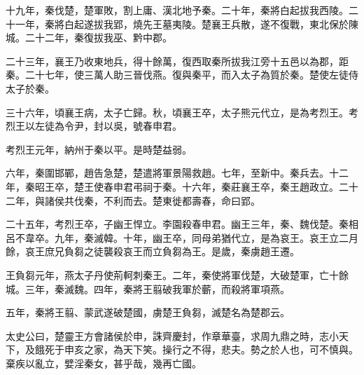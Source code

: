 十九年，秦伐楚，楚軍敗，割上庸、漢北地予秦。二十年，秦將白起拔我西陵。二十一年，秦將白起遂拔我郢，燒先王墓夷陵。楚襄王兵散，遂不復戰，東北保於陳城。二十二年，秦復拔我巫、黔中郡。

二十三年，襄王乃收東地兵，得十餘萬，復西取秦所拔我江旁十五邑以為郡，距秦。二十七年，使三萬人助三晉伐燕。復與秦平，而入太子為質於秦。楚使左徒侍太子於秦。

三十六年，頃襄王病，太子亡歸。秋，頃襄王卒，太子熊元代立，是為考烈王。考烈王以左徒為令尹，封以吳，號春申君。

考烈王元年，納州于秦以平。是時楚益弱。

六年，秦圍邯鄲，趙告急楚，楚遣將軍景陽救趙。七年，至新中。秦兵去。十二年，秦昭王卒，楚王使春申君弔祠于秦。十六年，秦莊襄王卒，秦王趙政立。二十二年，與諸侯共伐秦，不利而去。楚東徙都壽春，命曰郢。

二十五年，考烈王卒，子幽王悍立。李園殺春申君。幽王三年，秦、魏伐楚。秦相呂不韋卒。九年，秦滅韓。十年，幽王卒，同母弟猶代立，是為哀王。哀王立二月餘，哀王庶兄負芻之徒襲殺哀王而立負芻為王。是歲，秦虜趙王遷。

王負芻元年，燕太子丹使荊軻刺秦王。二年，秦使將軍伐楚，大破楚軍，亡十餘城。三年，秦滅魏。四年，秦將王翦破我軍於蘄，而殺將軍項燕。

五年，秦將王翦、蒙武遂破楚國，虜楚王負芻，滅楚名為楚郡云。

太史公曰，楚靈王方會諸侯於申，誅齊慶封，作章華臺，求周九鼎之時，志小天下，及餓死于申亥之家，為天下笑。操行之不得，悲夫。勢之於人也，可不慎與。棄疾以亂立，嬖淫秦女，甚乎哉，幾再亡國。